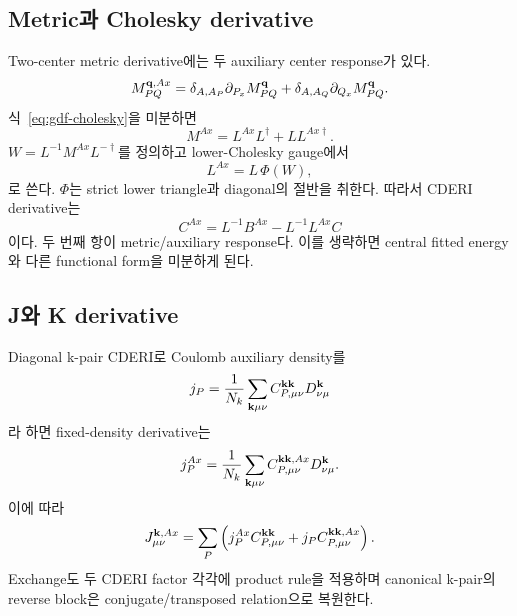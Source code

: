 \subsection{Metric과 Cholesky derivative}

Two-center metric derivative에는 두 auxiliary center response가 있다.
\begin{equation}
  M_{PQ}^{\mathbf{q},Ax}
  =\delta_{A,A_P}\partial_{P_x}M_{PQ}^{\mathbf{q}}
   +\delta_{A,A_Q}\partial_{Q_x}M_{PQ}^{\mathbf{q}}.
  \label{eq:gdf-metric-centers}
\end{equation}
식~\eqref{eq:gdf-cholesky}을 미분하면
\begin{equation}
  M^{Ax}=L^{Ax}L^\dagger+LL^{Ax\dagger}.
  \label{eq:gdf-cholesky-derivative}
\end{equation}
$W=L^{-1}M^{Ax}L^{-\dagger}$를 정의하고 lower-Cholesky gauge에서
\begin{equation}
  L^{Ax}=L\,\Phi(W),
  \label{eq:gdf-cholesky-gauge}
\end{equation}
로 쓴다. $\Phi$는 strict lower triangle과 diagonal의 절반을 취한다. 따라서 CDERI
derivative는
\begin{equation}
  C^{Ax}
  =L^{-1}B^{Ax}-L^{-1}L^{Ax}C
  \label{eq:gdf-cderi-derivative}
\end{equation}
이다. 두 번째 항이 metric/auxiliary response다. 이를 생략하면 central fitted energy와
다른 functional form을 미분하게 된다.

\subsection{J와 K derivative}

Diagonal k-pair CDERI로 Coulomb auxiliary density를
\begin{equation}
  j_P=\frac{1}{N_k}\sum_{\mathbf{k}\mu\nu}
      C_{P,\mu\nu}^{\mathbf{k}\mathbf{k}}D_{\nu\mu}^{\mathbf{k}}
  \label{eq:gdf-coulomb-aux-density}
\end{equation}
라 하면 fixed-density derivative는
\begin{equation}
  j_P^{Ax}=\frac{1}{N_k}\sum_{\mathbf{k}\mu\nu}
      C_{P,\mu\nu}^{\mathbf{k}\mathbf{k},Ax}D_{\nu\mu}^{\mathbf{k}}.
  \label{eq:gdf-coulomb-aux-derivative}
\end{equation}
이에 따라
\begin{equation}
  J_{\mu\nu}^{\mathbf{k},Ax}
  =\sum_P\left(j_P^{Ax}C_{P,\mu\nu}^{\mathbf{k}\mathbf{k}}
              +j_PC_{P,\mu\nu}^{\mathbf{k}\mathbf{k},Ax}\right).
  \label{eq:gdf-j-derivative}
\end{equation}
Exchange도 두 CDERI factor 각각에 product rule을 적용하며 canonical k-pair의 reverse
block은 conjugate/transposed relation으로 복원한다.

